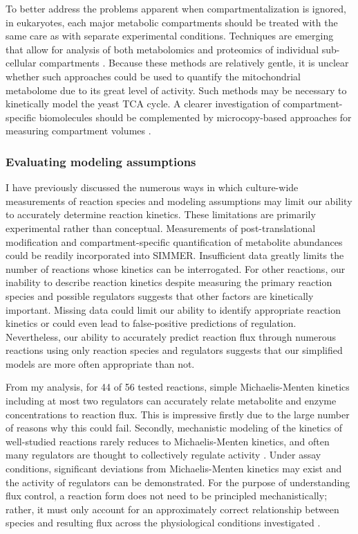 To better address the problems apparent when compartmentalization is ignored, in eukaryotes, each major metabolic compartments should be treated with the same care as with separate experimental conditions. Techniques are emerging that allow for analysis of both metabolomics and proteomics of individual sub-cellular compartments \cite{Klie:2011kq, Wuhr:2014fr}. Because these methods are relatively gentle, it is unclear whether such approaches could be used to quantify the mitochondrial metabolome due to its great level of activity. Such methods may be necessary to kinetically model the yeast TCA cycle. A clearer investigation of compartment-specific biomolecules should be complemented by microcopy-based approaches for measuring compartment volumes \cite{JENSEN:1993bz, Ghaemmaghami:2003ds}.

\subsubsection{Evaluating modeling assumptions}

I have previously discussed the numerous ways in which culture-wide measurements of reaction species and modeling assumptions may limit our ability to accurately determine reaction kinetics. These limitations are primarily experimental rather than conceptual. Measurements of post-translational modification and compartment-specific quantification of metabolite abundances could be readily incorporated into SIMMER. Insufficient data greatly limits the number of reactions whose kinetics can be interrogated. For other reactions, our inability to describe reaction kinetics despite measuring the primary reaction species  and possible regulators suggests that other factors are kinetically important. Missing data could limit our ability to identify appropriate reaction kinetics or could even lead to false-positive predictions of regulation. Nevertheless, our ability to accurately predict reaction flux through numerous reactions using only reaction species and regulators suggests that our simplified models are more often appropriate than not.

From my analysis, for 44 of 56 tested reactions, simple Michaelis-Menten kinetics including at most two regulators can accurately relate metabolite and enzyme concentrations to reaction flux. This is impressive firstly due to the large number of reasons why this could fail. Secondly, mechanistic modeling of the kinetics of well-studied reactions rarely reduces to Michaelis-Menten kinetics, and often many regulators are thought to collectively regulate activity \cite{Hill:1977vm}.  Under assay conditions, significant deviations from Michaelis-Menten kinetics may exist and the activity of regulators can be demonstrated. For the purpose of understanding flux control, a reaction form does not need to be principled mechanistically; rather, it must only account for an approximately correct relationship between species and resulting flux across the physiological conditions investigated \cite{Fell:1997wg}. 

